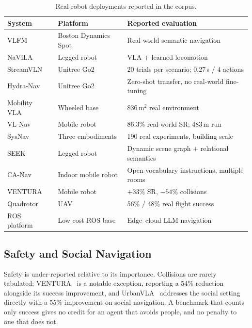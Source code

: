\documentclass[journal]{IEEEtran}
\begin{document}
\begin{table}[!t]
  \caption{Real-robot deployments reported in the corpus.}
  \label{tab:realrobot}
  \centering
  \footnotesize
  \begin{tabular}{llp{2.5cm}}
    \toprule
    System & Platform & Reported evaluation \\
    \midrule
    VLFM~\cite{yokoyama2024vlfm}          & Boston Dynamics Spot & Real-world semantic navigation \\
    NaVILA~\cite{cheng2024navila}         & Legged robot         & VLA + learned locomotion \\
    StreamVLN~\cite{wei2025streamvln}     & Unitree Go2          & 20 trials per scenario; 0.27\,s / 4 actions \\
    Hydra-Nav~\cite{wang2026hydra}        & Unitree Go2          & Zero-shot transfer, no real-world fine-tuning \\
    Mobility VLA~\cite{chiang2024mobility}& Wheeled base         & 836\,m$^2$ real environment \\
    VL-Nav~\cite{du2025neuro}             & Mobile robot         & 86.3\% real-world SR; 483\,m run \\
    SysNav~\cite{zhu2026sysnav}           & Three embodiments    & 190 real experiments, building scale \\
    SEEK~\cite{ginting2024seek}           & Legged robot         & Dynamic scene graph + relational semantics \\
    CA-Nav~\cite{chen2025constraint}      & Indoor mobile robot  & Open-vocabulary instructions, multiple rooms \\
    VENTURA~\cite{zhang2025ventura}       & Mobile robot         & $+33\%$ SR, $-54\%$ collisions \\
    Quadrotor~\cite{liu2026visual}        & UAV                  & 56\% / 48\% real flight success \\
    ROS platform~\cite{pun2026based}      & Low-cost ROS base    & Edge--cloud LLM navigation \\
    \bottomrule
  \end{tabular}
\end{table}

\subsection{Safety and Social Navigation}
Safety is under-reported relative to its importance. Collisions are rarely
tabulated; VENTURA~\cite{zhang2025ventura} is a notable exception, reporting
a 54\% reduction alongside its success improvement, and
UrbanVLA~\cite{li2025urbanvla} addresses the social setting directly with a
55\% improvement on social navigation. A benchmark that counts only success
gives no credit for an agent that avoids people, and no penalty to one that
does not.
\end{document}
